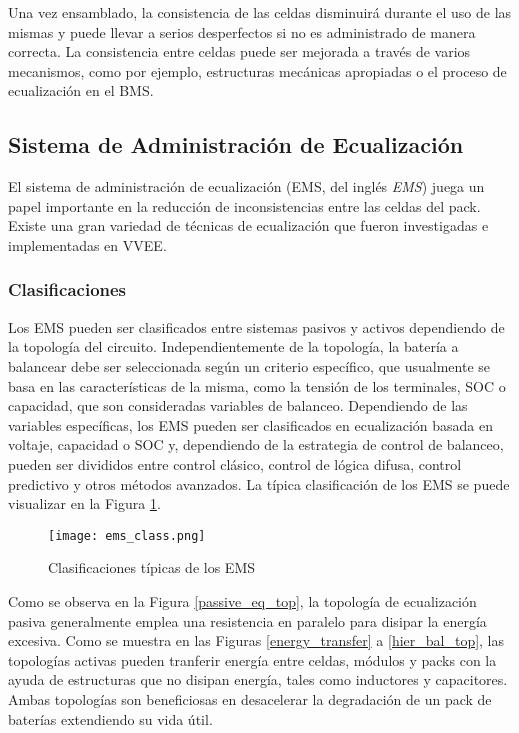 Una vez ensamblado, la consistencia de las celdas disminuir\'a durante el uso de
las mismas y puede llevar a serios desperfectos si no es administrado de manera
correcta. La consistencia entre celdas puede ser mejorada a trav\'es de varios
mecanismos, como por ejemplo, estructuras mec\'anicas apropiadas o el proceso de 
ecualizaci\'on en el \acrshort{BMS}.

\subsection{Sistema de Administraci\'on de Ecualizaci\'on}

El sistema de administraci\'on de ecualizaci\'on (\acrshort{EMS}, del ingl\'es
\emph{\acrlong{EMS}}) juega un papel importante en la reducci\'on de
inconsistencias entre las celdas del pack. Existe una gran variedad de
t\'ecnicas de ecualizaci\'on que fueron investigadas e implementadas en
\acrshort{VVEE}.

\subsubsection{Clasificaciones}

Los \acrshort{EMS} pueden ser clasificados entre sistemas pasivos y activos
dependiendo de la topolog\'ia del circuito. Independientemente de la
topolog\'ia, la bater\'ia a balancear debe ser seleccionada seg\'un un criterio
espec\'ifico, que usualmente se basa en las caracter\'isticas de la misma, como
la tensi\'on de los terminales, \acrshort{SOC} o capacidad, que son consideradas
variables de balanceo. Dependiendo de las variables espec\'ificas, los 
\acrshort{EMS} pueden ser clasificados en ecualizaci\'on basada en voltaje, 
capacidad o \acrshort{SOC} y, dependiendo de la estrategia de control de 
balanceo, pueden ser divididos entre control cl\'asico, control de l\'ogica 
difusa, control predictivo y otros m\'etodos avanzados. La t\'ipica
clasificaci\'on de los \acrshort{EMS} se puede visualizar en la Figura
\ref{ems_classes}.

\begin{figure}[h!]
    \begin{center}
        \texttt{[image: ems\_class.png]}
        \caption{Clasificaciones t\'ipicas de los \acrshort{EMS}}
        \label{ems_classes}
    \end{center}
\end{figure}

Como se observa en la Figura \ref{passive_eq_top}, la topolog\'ia de
ecualizaci\'on pasiva generalmente emplea una resistencia en paralelo para
disipar la energ\'ia excesiva. Como se muestra en las Figuras
\ref{energy_transfer} a \ref{hier_bal_top}, las topolog\'ias activas pueden
tranferir energ\'ia entre celdas, m\'odulos y packs con la ayuda de estructuras
que no disipan energ\'ia, tales como inductores y capacitores. Ambas
topolog\'ias son beneficiosas en desacelerar la degradaci\'on de un pack de
bater\'ias extendiendo su vida \'util.

